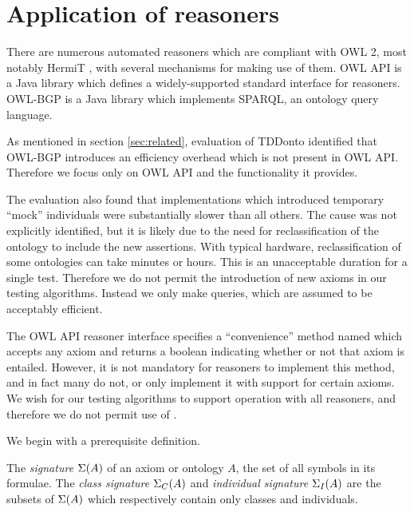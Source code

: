 \documentclass[paper.tex]{subfiles}
\begin{document}
\section{Application of reasoners}
\label{sec:reasoners}

There are numerous automated reasoners which are compliant with OWL 2, most notably HermiT \cite{Glimm:HermiT}, with several mechanisms for making use of them.  OWL API \cite{OWLAPI} is a Java library which defines a widely-supported standard interface for reasoners.  OWL-BGP \cite{OWLBGP} is a Java library which implements SPARQL, an ontology query language.

As mentioned in section \ref{sec:related}, evaluation of TDDonto identified that OWL-BGP introduces an efficiency overhead which is not present in OWL API.  Therefore we focus only on OWL API and the functionality it provides.

The evaluation also found that implementations which introduced temporary ``mock'' individuals were substantially slower than all others.  The cause was not explicitly identified, but it is likely due to the need for reclassification of the ontology to include the new assertions.  With typical hardware, reclassification of some ontologies can take minutes or hours.  This is an unacceptable duration for a single test.  \todo[yuck]  Therefore we do not permit the introduction of new axioms in our testing algorithms.  Instead we only make queries, which are assumed to be acceptably efficient.  

The OWL API reasoner interface specifies a ``convenience'' method named  which accepts any axiom and returns a boolean indicating whether or not that axiom is entailed.  However, it is not mandatory for reasoners to implement this method, and in fact many do not, or only implement it with support for certain axioms.  We wish  for our testing algorithms to support operation with all reasoners, and therefore we do not permit use of .  \todo[requirement]

\todo[connect]

We begin with a prerequisite definition.

\begin{definition}
  The \emph{signature} $\Sigma(A)$ of an axiom or ontology $A$, the set of all symbols in its formulae.  The \emph{class signature} $\Sigma_C(A)$ and \emph{individual signature} $\Sigma_I(A)$ are the subsets of $\Sigma(A)$ which respectively contain only classes and individuals.
\end{definition}
\end{document}
